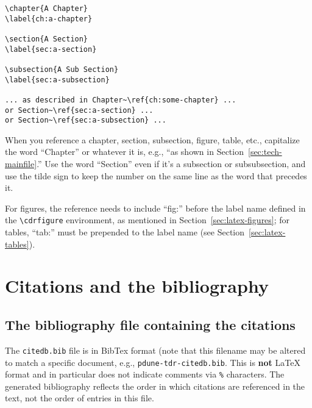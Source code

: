 \begin{verbatim}
\chapter{A Chapter}
\label{ch:a-chapter}

\section{A Section}
\label{sec:a-section}

\subsection{A Sub Section}
\label{sec:a-subsection}

... as described in Chapter~\ref{ch:some-chapter} ... 
or Section~\ref{sec:a-section} ... 
or Section~\ref{sec:a-subsection} ...

\end{verbatim}


When you reference a chapter, section, subsection, figure, table,
etc., capitalize the word ``Chapter'' or whatever it is, e.g., ``as
shown in Section~\ref{sec:tech-mainfile}.''
Use the word ``Section'' even if it's a subsection or subsubsection,
and use the tilde sign to keep the number on the same line as the word
that precedes it.

For figures, the reference needs to include ``fig:'' before the label name defined in the \verb|\cdrfigure| environment, as mentioned in Section~\ref{sec:latex-figures}; for tables, ``tab:'' must be prepended to the label name (see Section~\ref{sec:latex-tables}).


\section{Citations and the bibliography}
\label{sec:latex-cit}

\subsection{The bibliography file containing the citations}
\label{sec:latex-bib-file}

The \texttt{citedb.bib} file is in BibTex format  (note that this filename may be altered to match a specific document, e.g., \texttt{pdune-tdr-citedb.bib}.
This is \textbf{not} \LaTeX{} format and in particular does not
indicate comments via \texttt{\%} characters.
The
generated bibliography reflects the order in which citations are referenced in the text, not the order of entries in this file.

